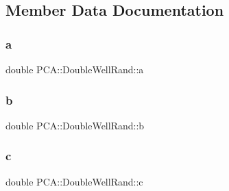 \subsection{Member Data Documentation}
\hypertarget{class_p_c_a_1_1_double_well_rand_a2291611a2ea4d9c3ee50a904c2fea9b7}{}\label{class_p_c_a_1_1_double_well_rand_a2291611a2ea4d9c3ee50a904c2fea9b7} 
\subsubsection{\texorpdfstring{a}{a}}
{\footnotesize\ttfamily double P\+C\+A\+::\+Double\+Well\+Rand\+::a\hspace{0.3cm}{\ttfamily [private]}}

\hypertarget{class_p_c_a_1_1_double_well_rand_a289b59fbd571f8f377888f48a8c6b8ae}{}\label{class_p_c_a_1_1_double_well_rand_a289b59fbd571f8f377888f48a8c6b8ae} 
\subsubsection{\texorpdfstring{b}{b}}
{\footnotesize\ttfamily double P\+C\+A\+::\+Double\+Well\+Rand\+::b\hspace{0.3cm}{\ttfamily [private]}}

\hypertarget{class_p_c_a_1_1_double_well_rand_a855b2106b6b692f9e837ef282b658c85}{}\label{class_p_c_a_1_1_double_well_rand_a855b2106b6b692f9e837ef282b658c85} 
\subsubsection{\texorpdfstring{c}{c}}
{\footnotesize\ttfamily double P\+C\+A\+::\+Double\+Well\+Rand\+::c\hspace{0.3cm}{\ttfamily [private]}}

\hypertarget{class_p_c_a_1_1_double_well_rand_a627173c860baf5c9744916fc9e203404}{}\label{class_p_c_a_1_1_double_well_rand_a627173c860baf5c9744916fc9e203404} 
